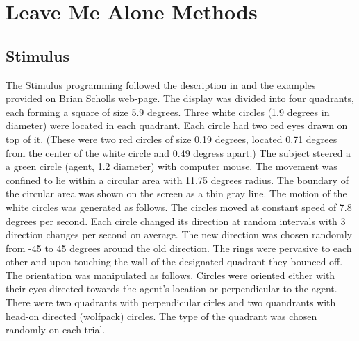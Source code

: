 \documentclass{article}
\begin{document}


\section{Leave Me Alone Methods}

\subsection{Stimulus}
The Stimulus programming followed the description in \citet{gao10} and the examples provided on Brian Scholls web-page. The display was divided into four quadrants, each forming a square of size 5.9 degrees. Three white circles (1.9 degrees in diameter) were located in each quadrant. Each circle had two red eyes drawn on top of it. (These were two red circles of size 0.19 degrees, located 0.71 degrees from the center of the white circle and 0.49 degress apart.) The subject steered a a green circle (agent, 1.2 diameter) with computer mouse. The movement was confined to lie within a circular area with 11.75 degrees radius. The boundary of the circular area was shown on the screen as a thin gray line. The motion of the white circles was generated as follows. The circles moved at constant speed of 7.8 degrees per second. Each circle changed its direction at random intervals with 3 direction changes per second on average. The new direction was chosen randomly from -45 to 45 degrees around the old direction. The rings were pervasive to each other and upon touching the wall of the designated quadrant they bounced off. \\
The orientation was manipulated as follows. Circles were oriented either with their eyes directed towards the agent's location or perpendicular to the agent. There were two quadrants with perpendicular cirles and two quandrants with head-on directed (wolfpack) circles. The type of the quadrant was chosen randomly on each trial. \\
\end{document}

